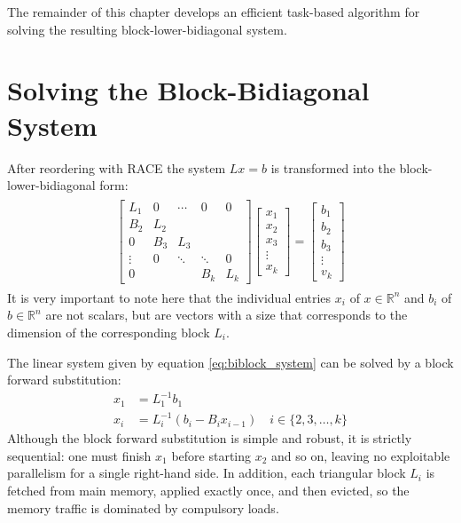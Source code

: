 The remainder of this chapter develops an efficient task-based algorithm
for solving the resulting block-lower-bidiagonal system.

\section{Solving the Block-Bidiagonal System}
\label{chap:meth_solving_bi_block} 
After reordering with RACE the system $Lx=b$ is transformed into the block-lower-bidiagonal form: 
\begin{align}
\label{eq:biblock_system}
    \begin{array}{c} 
        \begin{bmatrix}
         L_1&0 & \cdots& 0& 0\\
         B_2&L_2 & & & \\
         0& B_3&L_3 & & \\
         \vdots& 0&\ddots &\ddots & 0\\
         0& & &B_k &L_k 
    \end{bmatrix} 
    \begin{bmatrix}
        x_1 \\ x_2\\ x_3 \\ \vdots \\ x_k
    \end{bmatrix} = 
    \begin{bmatrix}
        b_1 \\ b_2 \\ b_3 \\ \vdots \\ v_k
    \end{bmatrix}
  \end{array}
\end{align}
It is very important to note here that the individual entries $x_i$ of $x \in \mathbb{R}^n$ and $b_i$ of $b \in \mathbb{R}^n$ are not scalars, but are vectors with a size that corresponds to the dimension of the corresponding block $L_i$. 

The linear system given by equation \ref{eq:biblock_system} can be solved by a block forward substitution:
\begin{align}
    x_1 &= L_1^{-1} b_1
    \\
    x_i &= L_i^{-1}(b_i - B_i x_{i-1}) \quad i \in \{2, 3, \dots, k \}
\end{align}
Although the block forward substitution is simple and robust, it is strictly sequential: one must finish $x_{1}$ before starting
$x_{2}$ and so on, leaving no exploitable parallelism for a single right-hand side.  In addition, each triangular block $L_{i}$ is fetched from main memory, applied exactly once, and then evicted, so the memory traffic is dominated by compulsory loads.

